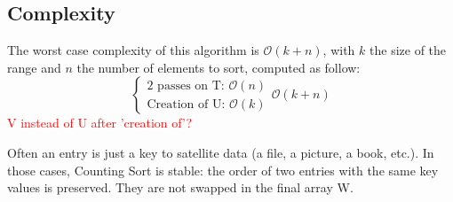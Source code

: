 \subsection{Complexity} The worst case complexity of this algorithm is $\mathcal{O}(k+n)$, with $k$ the size of the range and $n$ the number of elements to sort, computed as follow:
\[ 
\begin{cases}
\text{2 passes on T: } \mathcal{O}(n) \\
\text{Creation of U: } \mathcal{O}(k)
\end{cases} \mathcal{O}(k+n)
\]
\textcolor{red}{V instead of U after 'creation of'?}
\begin{remark} Often an entry is just a key to satellite data (a file, a picture, a book, etc.). In those cases, Counting Sort is stable: the order of two entries with the same key values is preserved. They are not swapped in the final array W. \end{remark}